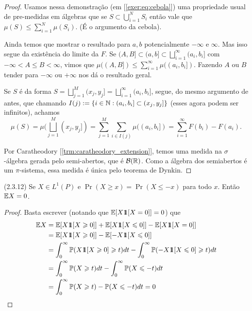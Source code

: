 \begin{proof}
	Usamos nessa demonstração (em [\ref{exer:eq:cebola}]) uma
	propriedade usual de pre-medidas em álgebras que se $S \subset
	\bigcup_{i=1}^N S_i$ então
	vale que $\mu(S) \leq \sum_{i = 1}^{N} \mu(S_i)$. (É o argumento da cebola).

	Ainda temos que mostrar o resultado para $a,b$ potencialmente
	$-\infty$ e $\infty$. Mas isso segue da existência do limite da $F$.
	Se $(A,B] \subset (a,b] \subset \bigsqcup_{i=1}^{\infty} (a_i, b_i]$
	com $-\infty < A \leq B < \infty$, vimos que
	$\mu((A,B]) \leq \sum_{i = 1}^{\infty} \mu((a_i,b_i])$. Fazendo $A$
	ou $B$ tender para $-\infty$ ou $+\infty$ nos dá o resultado geral.

	Se $S$ é da forma $S = \bigsqcup_{j = 1}^{M} (x_j,y_j] =
	\bigsqcup_{i = 1}^{\infty} (a_i, b_i]$,
	segue, do mesmo argumento de antes, que chamando $I(j) := \{i \in \mathbb{N}
	: (a_i,b_i]  \subset (x_j, y_j] \}$
	(esses agora podem ser infinitos), achamos
	\[
		\mu(S) = \mu(\bigsqcup_{j = 1}^{M} (x_j, y_j]) = \sum_{j = 1}^M
		\sum_{i \in I(j)} \mu((a_i,b_i])
		= \sum_{i = 1}^{\infty} F(b_i) - F(a_i).
	\]

	Por Caratheodory [\ref{trm:caratheodory_extension}], temos uma
	medida na $\sigma$-álgebra gerada pelo semi-abertos, que é
	$\mathcal{B}(\mathbb{R})$. Como a álgebra
	dos semiabertos é um $\pi$-sistema, essa medida é única pelo teorema de Dynkin.
\end{proof}

\begin{exercise}
	(2.3.12)
	Se $X \in L^1(P)$ e $\Pr(X \geq x) = \Pr(X \leq -x)$ para todo $x$.
	Então $\mathbb{E} X = 0$.
\end{exercise}
\begin{proof}
	Basta escrever (notando que $\mathbb{E}[X \hbox{$1\mkern-6.5mu1$}[X = 0]] = 0$) que
	\begin{align*}
		\Ex X &= \Ex[X \id[X \geq 0]] + \Ex[X\id[X \leq 0]] - \E[X \id[X = 0]]\\
		&= \Ex[X \id[X \geq 0]] - \Ex[-X \id[X \leq 0]]\\
		&= \int_{0}^{\infty} \Pr(X\id[X \geq 0] \geq t)dt -
		\int_{0}^{\infty} \Pr(-X\id[X \leq 0] \geq t)dt\\
		&= \int_{0}^{\infty} \Pr(X \geq t)dt - \int_{0}^{\infty} \Pr(X \leq -t)dt\\
		&= \int_{0}^{\infty} \Pr(X \geq t) - \Pr(X \leq -t) dt = 0
	\end{align*}
\end{proof}
\pagebreak
